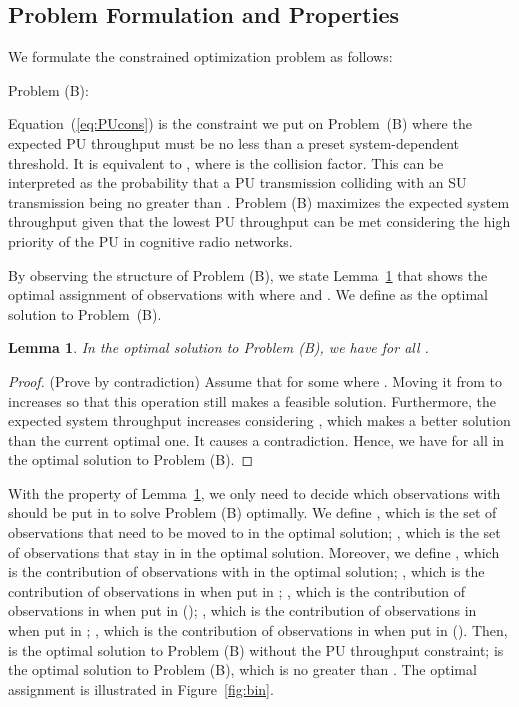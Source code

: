 \documentclass[conference]{IEEEtran}
\newtheorem{lemma}[theorem]{Lemma}
\begin{document}
\subsection{Problem Formulation and Properties}
\label{subsec:form}
We formulate the constrained optimization problem as follows:

Problem (B):
\vspace{-0.5em}

\vspace{-0.8em}

Equation~(\ref{eq:PUcons}) is the constraint we put on Problem~(B) where the expected PU throughput must be no less than a preset system-dependent threshold. It is equivalent to , where  is the collision factor. This can be interpreted as the probability that a PU transmission colliding with an SU transmission being no greater than . Problem (B) maximizes the expected system throughput given that the lowest PU throughput can be met considering the high priority of the PU in cognitive radio networks.

By observing the structure of Problem (B), we state Lemma~\ref{lem:Bayesian} that shows the optimal assignment of observations with  where  and 
. We define  as the optimal solution to Problem~(B).

\begin{lemma}
\label{lem:Bayesian}
In the optimal solution to Problem (B), we have  for all .
\end{lemma}

\begin{proof}
(Prove by contradiction) Assume that  for some  where . Moving it from  to  increases  so that this operation still makes a feasible solution. Furthermore, the expected system throughput increases considering , which makes a better solution than the current optimal one. It causes a contradiction. Hence, we have  for all  in the optimal solution to Problem (B).
\end{proof}

With the property of Lemma~\ref{lem:Bayesian}, we only need to decide which observations with  should be put in  to solve Problem (B) optimally. We define , which is the set of observations that need to be moved to  in the optimal solution; , which is the set of observations that stay in  in the optimal solution. Moreover, we define , which is the contribution of observations with  in the optimal solution; , which is the contribution of observations in  when put in ; , which is the contribution of observations in  when put in  (); , which is the contribution of observations in  when put in ; , which is the contribution of observations in  when put in  (). Then,  is the optimal solution to Problem (B) without the PU throughput constraint;  is the optimal solution to Problem (B), which is no greater than . The optimal assignment is illustrated in Figure~\ref{fig:bin}. 
\end{document}
